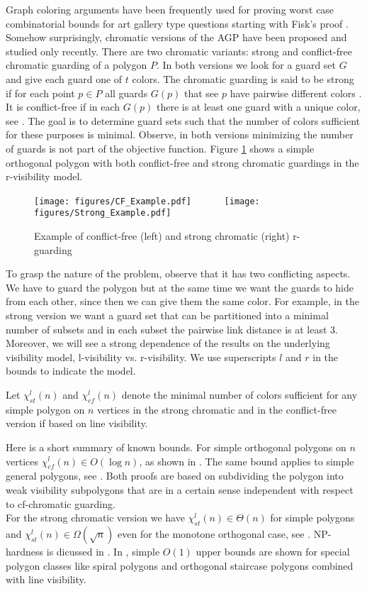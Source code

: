 \documentclass[a4paper,USenglish,numberwithinsect]{lipics}
\theoremstyle{plain}
\begin{document}
Graph  coloring arguments have been frequently
used  for proving worst case combinatorial bounds for art
gallery type questions starting with Fisk's proof \cite{Fisk}. Somehow
surprisingly, chromatic versions of the AGP have been
proposed and studied only recently. There are two chromatic variants: strong
 and conflict-free chromatic guarding  of a polygon $P$. In  both
versions we look for a guard set $G$ and give each guard one of $t$
colors. The chromatic guarding is said to be strong if for each point
$p\in P$ all guards $G(p)$ that see $p$ have pairwise different colors
\cite{ELV}.  It is conflict-free if in  each $G(p)$  there is at least
one guard with a unique color, see \cite{BS}. The goal is to determine guard
sets such that the   number of colors sufficient  for these purposes is
minimal.  Observe, in both versions minimizing the number of guards is not
part of the objective function.  Figure \ref{cf_st_example} shows a simple orthogonal polygon with
both conflict-free and strong chromatic guardings in the r-visibility model.
\begin{figure}
\centering
\texttt{[image: figures/CF\_Example.pdf]}
\ \ \ \ \ \ \texttt{[image: figures/Strong\_Example.pdf]}

\caption{Example of conflict-free (left) and strong chromatic (right) r-guarding}
\label{cf_st_example}
\end{figure}
To grasp the nature of the problem, observe that it has two conflicting aspects. 
We have to guard the polygon but at the same time we want the guards to hide from each other, 
since then we can give them the same color. For example, in the strong version we want a guard set 
that can be partitioned into a minimal number of subsets and in each subset the pairwise link distance is at least 3.
Moreover, we will see a strong dependence of the results on the underlying visibility model, l-visibility vs. r-visibility. We use superscripts
$l$ and $r$ in the bounds to indicate the model.

Let $\chi_{st}^l(n)$ and  $\chi_{cf}^l(n)$ denote the minimal number of colors sufficient for any simple polygon on $n$ vertices in the strong chromatic and in the conflict-free version if based on line visibility.

Here is a short summary of known bounds. For simple orthogonal polygons on $n$ vertices
$\chi_{cf}^l(n)\in O(\log n)$, as shown in  \cite{BS}. The same bound
applies to simple general polygons, see \cite{B_etal}.
Both proofs are based on subdividing the polygon into weak visibility
subpolygons that are in a certain sense independent with respect to
cf-chromatic guarding.
\\
For the strong chromatic version we have $\chi^l_{st}(n) \in \Theta(n)$
for simple polygons and $\chi^l_{st}(n) \in \Omega(\sqrt{n})$ even for
the monotone orthogonal case,
 see \cite{ELV}. NP-hardness is dicussed in \cite{FFH}. In \cite{ELV}, simple $O(1)$ upper bounds are shown
for special polygon classes like spiral polygons and orthogonal
staircase polygons combined with line visibility. 
\end{document}
